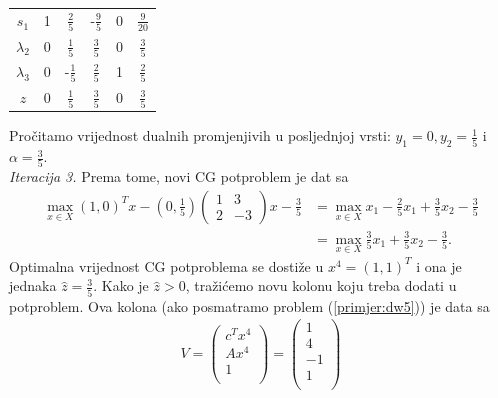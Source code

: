 \documentclass[a4paper, utf8, 11pt, colorlinks]{book}
\begin{document}
\begin{center}
	
	\begin{tabular}{c|cccc|c}
		$s_1$	    &   1      &    $\frac{2}{5}$          &   -$\frac{9}{5}$       &   0          &  $\frac{9}{20}$ \\
		$\lambda_2$  &   0      &    $\frac{1}{5}$         &   $\frac{3}{5}$        &   0          &  $\frac{3}{5}$             \\
		$\lambda_3$  &   0      &    -$\frac{1}{5}$        &   $\frac{2}{5}$        &   1          &  $\frac{2}{5}$            \\ \hline
		$z$          &   0      &    $\frac{1}{5}$         &  $ \frac{3}{5}$        &   0           & $\frac{3}{5}$
	\end{tabular}
	
\end{center} 
  Pročitamo vrijednost dualnih promjenjivih u posljednjoj vrsti: $y_1 =0, y_2=\frac{1}{5}$ i $\alpha=\frac{3}{5}$.\\ \emph{Iteracija 3.} Prema tome, novi CG potproblem je dat sa 
  \begin{align*}
        \max_{x \in X} (1, 0)^T x - (0, \frac{1}{5})\left(\begin{array}{cc}
       	1 & 3 \\
       	2 & -3
       \end{array}\right)  x   - \frac{3}{5} &= \max_{x \in X}x_1  - \frac{2}{5}x_1 + \frac{3}{5}x_2 - \frac{3}{5} \\
       &= \max_{x \in X} \frac{3}{5}x_1 + \frac{3}{5}x_2 - \frac{3}{5}.
  \end{align*} 
Optimalna vrijednost CG potproblema se dostiže u $x^{4} = (1, 1)^T$ i ona je jednaka $\hat{z}=\frac{3}{5}$. Kako je $\hat{z}>0$, tražićemo novu kolonu koju treba dodati u potproblem. Ova kolona (ako posmatramo problem (\ref{primjer:dw5})) je   data sa 
\begin{align}
	V =   \begin{pmatrix}
		c^T x^4\\
		A x^4  \\
		1     \\
	\end{pmatrix} = \begin{pmatrix}
		1 \\
		4  \\
		-1  \\
		1\\  
	\end{pmatrix}
\end{align}
\end{document}
